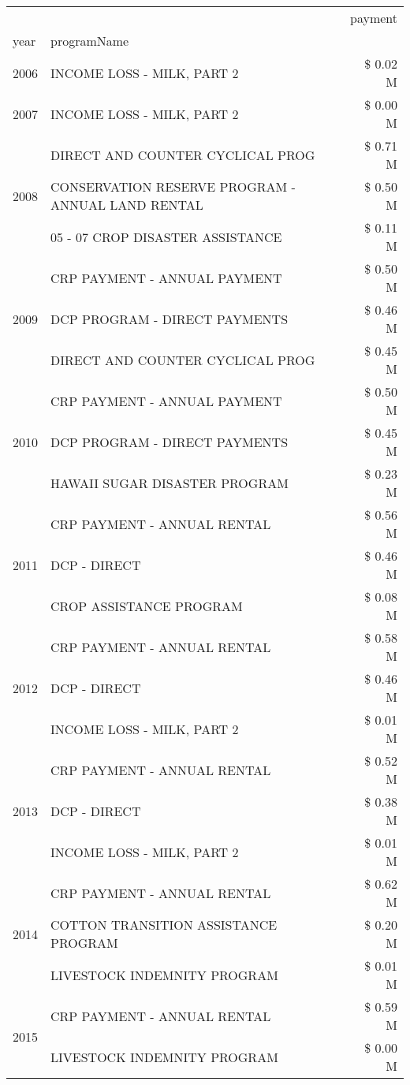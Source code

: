 \begin{tabular}{llr}
\toprule
 &  & payment \\
year & programName &  \\
\midrule
2006 & INCOME LOSS - MILK, PART 2 & \$ 0.02 M \\
\cline{1-3}
2007 & INCOME LOSS - MILK, PART 2 & \$ 0.00 M \\
\cline{1-3}
\multirow[t]{3}{*}{2008} & DIRECT AND COUNTER CYCLICAL PROG & \$ 0.71 M \\
 & CONSERVATION RESERVE PROGRAM - ANNUAL LAND RENTAL & \$ 0.50 M \\
 & 05 - 07 CROP DISASTER ASSISTANCE & \$ 0.11 M \\
\cline{1-3}
\multirow[t]{3}{*}{2009} & CRP PAYMENT - ANNUAL PAYMENT & \$ 0.50 M \\
 & DCP PROGRAM - DIRECT PAYMENTS & \$ 0.46 M \\
 & DIRECT AND COUNTER CYCLICAL PROG & \$ 0.45 M \\
\cline{1-3}
\multirow[t]{3}{*}{2010} & CRP PAYMENT - ANNUAL PAYMENT & \$ 0.50 M \\
 & DCP PROGRAM - DIRECT PAYMENTS & \$ 0.45 M \\
 & HAWAII SUGAR DISASTER PROGRAM & \$ 0.23 M \\
\cline{1-3}
\multirow[t]{3}{*}{2011} & CRP PAYMENT - ANNUAL RENTAL & \$ 0.56 M \\
 & DCP - DIRECT & \$ 0.46 M \\
 & CROP ASSISTANCE PROGRAM & \$ 0.08 M \\
\cline{1-3}
\multirow[t]{3}{*}{2012} & CRP PAYMENT - ANNUAL RENTAL & \$ 0.58 M \\
 & DCP - DIRECT & \$ 0.46 M \\
 & INCOME LOSS - MILK, PART 2 & \$ 0.01 M \\
\cline{1-3}
\multirow[t]{3}{*}{2013} & CRP PAYMENT - ANNUAL RENTAL & \$ 0.52 M \\
 & DCP - DIRECT & \$ 0.38 M \\
 & INCOME LOSS - MILK, PART 2 & \$ 0.01 M \\
\cline{1-3}
\multirow[t]{3}{*}{2014} & CRP PAYMENT - ANNUAL RENTAL & \$ 0.62 M \\
 & COTTON TRANSITION ASSISTANCE PROGRAM & \$ 0.20 M \\
 & LIVESTOCK INDEMNITY PROGRAM & \$ 0.01 M \\
\cline{1-3}
\multirow[t]{3}{*}{2015} & CRP PAYMENT - ANNUAL RENTAL & \$ 0.59 M \\
 & LIVESTOCK INDEMNITY PROGRAM & \$ 0.00 M \\

\end{tabular}
